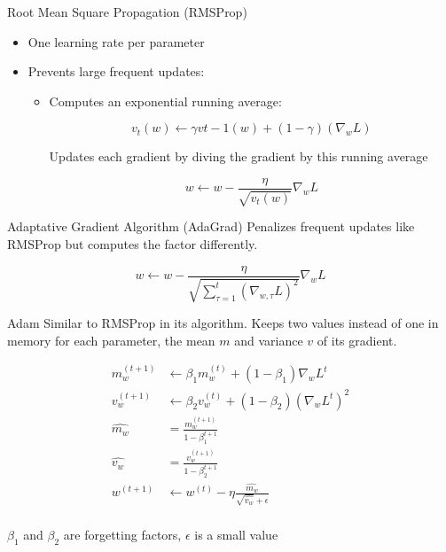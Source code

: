 \begin{frame}{Root Mean Square Propagation (RMSProp)}
  \begin{itemize}[<+->]
    \item One learning rate per parameter
    \item Prevents large frequent updates:
      \begin{itemize}
        \item Computes an exponential running average:

        \[v_t(w) \leftarrow \gamma v{t-1}(w) + (1 - \gamma)(\nabla_w L)\]

        Updates each gradient by diving the gradient by this running average

        \[w \leftarrow w - \frac{\eta}{\sqrt{v_t(w)}}\nabla_wL\]
      \end{itemize}
  \end{itemize}
\end{frame}

\begin{frame}{Adaptative Gradient Algorithm (AdaGrad)}
  Penalizes frequent updates like RMSProp but computes the factor differently.

  \[
    w \leftarrow w - \frac{\eta}{\sqrt{\sum_{\tau=1}^t(\nabla_{w,\tau} L)^2}}\nabla_{w} L
  \]
\end{frame}

\begin{frame}{Adam}
  Similar to RMSProp in its algorithm. Keeps two values instead of one in memory for each parameter, the mean $m$ and variance $v$ of its gradient.

  \begin{align*}
    m_w^{(t+1)} &\leftarrow \beta_1m_w^{(t)} + (1 - \beta_1)\nabla_wL^{t} \\
    v_w^{(t+1)} &\leftarrow \beta_2v_w^{(t)} + (1 - \beta_2)(\nabla_wL^{t})^2 \\
    \hat{m_w} &= \frac{m_w^{(t+1)}}{1 - \beta_1^{t+1}} \\
    \hat{v_w} &= \frac{v_w^{(t+1)}}{1 - \beta_2^{t+1}} \\
    w^{(t+1)} &\leftarrow w^{(t)} - \eta\frac{\hat{m_w}}{\sqrt{\hat{v_w}} + \epsilon} \\
  \end{align*}

  $\beta_1$ and $\beta_2$ are forgetting factors, $\epsilon$ is a small value
\end{frame}
